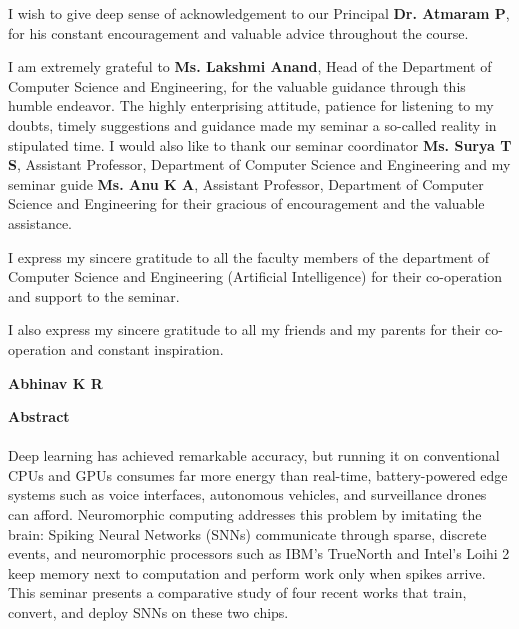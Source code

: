 \documentclass[12pt,a4paper,final]{extreport}
\begin{document}
I wish to give deep sense of acknowledgement to our Principal \textbf{Dr. Atmaram P}, for his constant encouragement and valuable advice throughout the course.

I am extremely grateful to \textbf{Ms. Lakshmi Anand}, Head of the Department of Computer Science and Engineering, for the valuable guidance through this humble endeavor. The highly enterprising attitude, patience for listening to my doubts, timely suggestions and guidance made my seminar a so-called reality in stipulated time.
I would also like to thank our seminar coordinator \textbf{Ms. Surya T S}, Assistant Professor, Department of Computer Science and Engineering and my seminar guide \textbf{Ms. Anu K A}, Assistant Professor, Department of Computer Science and Engineering for their gracious of encouragement and the valuable assistance.

I express my sincere gratitude to all the faculty members of the department of Computer Science and Engineering (Artificial Intelligence) for their co-operation and support to the seminar.

I also express my sincere gratitude to all my friends and my parents for their co-operation and constant inspiration.

\vspace{2cm}
\noindent\hfill
\begin{minipage}[t]{0.4\textwidth}
\centering
\textbf{Abhinav K R}
\end{minipage}

\newpage

\begin{center}
\begin{huge}
\textbf{Abstract}
\end{huge}
\end{center}

\vskip0.3cm

\begingroup
{}
\paragraph{} Deep learning has achieved remarkable accuracy, but running it on conventional CPUs and GPUs consumes far more energy than real-time, battery-powered edge systems such as voice interfaces, autonomous vehicles, and surveillance drones can afford. Neuromorphic computing addresses this problem by imitating the brain: Spiking Neural Networks (SNNs) communicate through sparse, discrete events, and neuromorphic processors such as IBM's TrueNorth and Intel's Loihi 2 keep memory next to computation and perform work only when spikes arrive. This seminar presents a comparative study of four recent works that train, convert, and deploy SNNs on these two chips.
\end{document}
